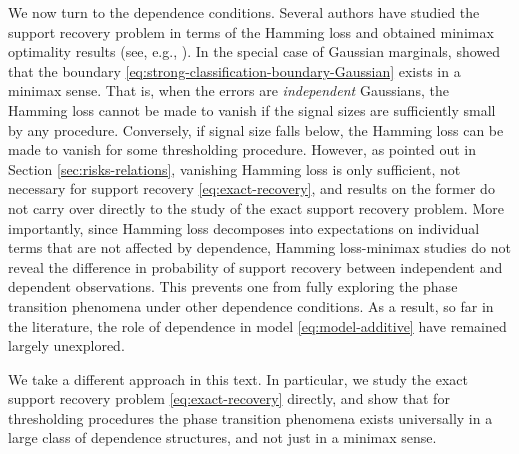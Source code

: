 \medskip

We now turn to the dependence conditions.
Several authors have studied the support recovery problem in terms of the Hamming loss and obtained minimax optimality results (see, e.g., \cite{ji2012ups, genovese2012comparison, jin2014optimality, butucea2018variable}).
In the special case of Gaussian marginals, \cite{butucea2018variable} showed that the boundary \eqref{eq:strong-classification-boundary-Gaussian} exists in a minimax sense.
That is, when the errors are \emph{independent} Gaussians, the Hamming loss cannot be made to vanish if the signal sizes are sufficiently small by any procedure. 
Conversely, if signal size falls below, the Hamming loss can be made to vanish for some thresholding procedure.
%
However, as pointed out in Section \ref{sec:risks-relations}, vanishing Hamming loss is only sufficient, not necessary for support recovery \eqref{eq:exact-recovery}, and results on the former do not carry over directly to the study of the exact support recovery problem.
More importantly, since Hamming loss decomposes into expectations on individual terms that are not affected by dependence, Hamming loss-minimax studies do not reveal the difference in probability of support recovery between independent and dependent observations. 
This prevents one from fully exploring the phase transition phenomena under other dependence conditions.
As a result, so far in the literature, the role of dependence in model \eqref{eq:model-additive} have remained largely unexplored. 

We take a different approach in this text. 
In particular, we study the exact support recovery problem \eqref{eq:exact-recovery} directly, and show that for thresholding procedures the phase transition phenomena exists {universally} in a large class of dependence structures, and not just in a minimax sense.


